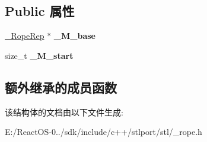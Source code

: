 \subsection*{Public 属性}
\begin{DoxyCompactItemize}
\item 
\mbox{\label{struct___rope___rope_substring_aca84de2470cf116ba7c1090158d4d141}} 
\hyperlink{struct___rope___rope_rep}{\+\_\+\+Rope\+Rep} $\ast$ {\bfseries \+\_\+\+M\+\_\+base}
\item 
\mbox{\label{struct___rope___rope_substring_ac090f624c798fe53e7f3915e64187519}} 
size\+\_\+t {\bfseries \+\_\+\+M\+\_\+start}
\end{DoxyCompactItemize}
\subsection*{额外继承的成员函数}


该结构体的文档由以下文件生成\+:\begin{DoxyCompactItemize}
\item 
E\+:/\+React\+O\+S-\/0../sdk/include/c++/stlport/stl/\+\_\+rope.\+h\end{DoxyCompactItemize}
